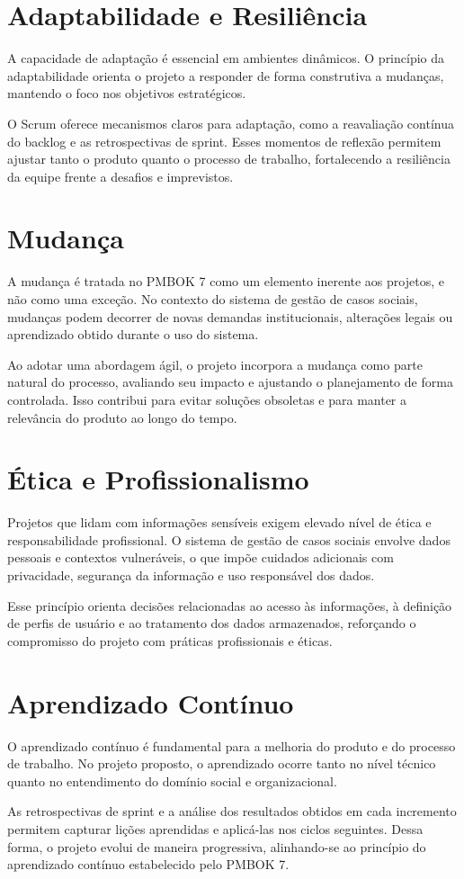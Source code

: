 \section{Adaptabilidade e Resiliência}

A capacidade de adaptação é essencial em ambientes dinâmicos. O princípio da adaptabilidade orienta o projeto a responder de forma construtiva a mudanças, mantendo o foco nos objetivos estratégicos.

O Scrum oferece mecanismos claros para adaptação, como a reavaliação contínua do backlog e as retrospectivas de sprint. Esses momentos de reflexão permitem ajustar tanto o produto quanto o processo de trabalho, fortalecendo a resiliência da equipe frente a desafios e imprevistos.

\section{Mudança}

A mudança é tratada no PMBOK 7 como um elemento inerente aos projetos, e não como uma exceção. No contexto do sistema de gestão de casos sociais, mudanças podem decorrer de novas demandas institucionais, alterações legais ou aprendizado obtido durante o uso do sistema.

Ao adotar uma abordagem ágil, o projeto incorpora a mudança como parte natural do processo, avaliando seu impacto e ajustando o planejamento de forma controlada. Isso contribui para evitar soluções obsoletas e para manter a relevância do produto ao longo do tempo.

\section{Ética e Profissionalismo}

Projetos que lidam com informações sensíveis exigem elevado nível de ética e responsabilidade profissional. O sistema de gestão de casos sociais envolve dados pessoais e contextos vulneráveis, o que impõe cuidados adicionais com privacidade, segurança da informação e uso responsável dos dados.

Esse princípio orienta decisões relacionadas ao acesso às informações, à definição de perfis de usuário e ao tratamento dos dados armazenados, reforçando o compromisso do projeto com práticas profissionais e éticas.

\section{Aprendizado Contínuo}

O aprendizado contínuo é fundamental para a melhoria do produto e do processo de trabalho. No projeto proposto, o aprendizado ocorre tanto no nível técnico quanto no entendimento do domínio social e organizacional.

As retrospectivas de sprint e a análise dos resultados obtidos em cada incremento permitem capturar lições aprendidas e aplicá-las nos ciclos seguintes. Dessa forma, o projeto evolui de maneira progressiva, alinhando-se ao princípio do aprendizado contínuo estabelecido pelo PMBOK 7.

